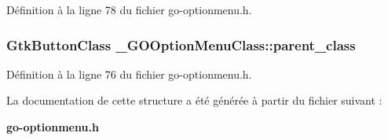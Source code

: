 Définition à la ligne 78 du fichier go-\/optionmenu.h.

\subsubsection[{parent\_\-class}]{\setlength{\rightskip}{0pt plus 5cm}GtkButtonClass {\bf \_\-GOOptionMenuClass::parent\_\-class}}\label{struct__GOOptionMenuClass_ae4693cab46951ffa5ff88678e5f80fe4}


Définition à la ligne 76 du fichier go-\/optionmenu.h.



La documentation de cette structure a été générée à partir du fichier suivant :\begin{DoxyCompactItemize}
\item 
{\bf go-\/optionmenu.h}\end{DoxyCompactItemize}
